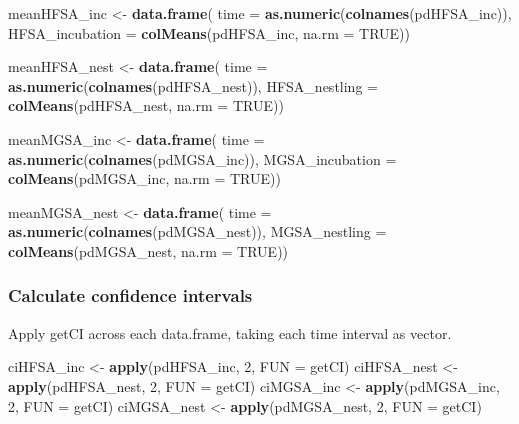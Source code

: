 \documentclass[]{article}
\newenvironment{Shaded}{\begin{snugshade}}{\end{snugshade}}
\newcommand{\DataTypeTok}[1]{\textcolor[rgb]{0.13,0.29,0.53}{#1}}
\newcommand{\DecValTok}[1]{\textcolor[rgb]{0.00,0.00,0.81}{#1}}
\newcommand{\KeywordTok}[1]{\textcolor[rgb]{0.13,0.29,0.53}{\textbf{#1}}}
\newcommand{\NormalTok}[1]{#1}
\newcommand{\OtherTok}[1]{\textcolor[rgb]{0.56,0.35,0.01}{#1}}
\newcommand{\StringTok}[1]{\textcolor[rgb]{0.31,0.60,0.02}{#1}}
\begin{document}
\begin{Shaded}
\begin{Highlighting}[]
\NormalTok{meanHFSA_inc <-}\StringTok{ }\KeywordTok{data.frame}\NormalTok{(}
  \DataTypeTok{time =} \KeywordTok{as.numeric}\NormalTok{(}\KeywordTok{colnames}\NormalTok{(pdHFSA_inc)),}
  \DataTypeTok{HFSA_incubation =} \KeywordTok{colMeans}\NormalTok{(pdHFSA_inc, }\DataTypeTok{na.rm =} \OtherTok{TRUE}\NormalTok{))}

\NormalTok{meanHFSA_nest <-}\StringTok{ }\KeywordTok{data.frame}\NormalTok{(}
  \DataTypeTok{time =} \KeywordTok{as.numeric}\NormalTok{(}\KeywordTok{colnames}\NormalTok{(pdHFSA_nest)),}
  \DataTypeTok{HFSA_nestling =} \KeywordTok{colMeans}\NormalTok{(pdHFSA_nest, }\DataTypeTok{na.rm =} \OtherTok{TRUE}\NormalTok{))}

\NormalTok{meanMGSA_inc <-}\StringTok{ }\KeywordTok{data.frame}\NormalTok{(}
  \DataTypeTok{time =} \KeywordTok{as.numeric}\NormalTok{(}\KeywordTok{colnames}\NormalTok{(pdMGSA_inc)),}
  \DataTypeTok{MGSA_incubation =} \KeywordTok{colMeans}\NormalTok{(pdMGSA_inc, }\DataTypeTok{na.rm =} \OtherTok{TRUE}\NormalTok{))}

\NormalTok{meanMGSA_nest <-}\StringTok{ }\KeywordTok{data.frame}\NormalTok{(}
  \DataTypeTok{time =} \KeywordTok{as.numeric}\NormalTok{(}\KeywordTok{colnames}\NormalTok{(pdMGSA_nest)),}
  \DataTypeTok{MGSA_nestling =} \KeywordTok{colMeans}\NormalTok{(pdMGSA_nest, }\DataTypeTok{na.rm =} \OtherTok{TRUE}\NormalTok{))}
\end{Highlighting}
\end{Shaded}

\hypertarget{calculate-confidence-intervals-1}{%
\subsubsection{Calculate confidence
intervals}\label{calculate-confidence-intervals-1}}

Apply getCI across each data.frame, taking each time interval as vector.

\begin{Shaded}
\begin{Highlighting}[]
\NormalTok{ciHFSA_inc <-}\StringTok{ }\KeywordTok{apply}\NormalTok{(pdHFSA_inc, }\DecValTok{2}\NormalTok{, }\DataTypeTok{FUN =}\NormalTok{ getCI)}
\NormalTok{ciHFSA_nest <-}\StringTok{ }\KeywordTok{apply}\NormalTok{(pdHFSA_nest, }\DecValTok{2}\NormalTok{, }\DataTypeTok{FUN =}\NormalTok{ getCI)}
\NormalTok{ciMGSA_inc <-}\StringTok{ }\KeywordTok{apply}\NormalTok{(pdMGSA_inc, }\DecValTok{2}\NormalTok{, }\DataTypeTok{FUN =}\NormalTok{ getCI)}
\NormalTok{ciMGSA_nest <-}\StringTok{ }\KeywordTok{apply}\NormalTok{(pdMGSA_nest, }\DecValTok{2}\NormalTok{, }\DataTypeTok{FUN =}\NormalTok{ getCI)}
\end{Highlighting}
\end{Shaded}
\end{document}
